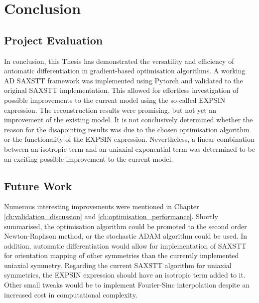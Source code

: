 \chapter{Conclusion}

\section{Project Evaluation}

In conclusion, this Thesis has demonstrated the versatility and efficiency of automatic differentiation in gradient-based optimisation algorithms.
A working AD SAXSTT framework was implemented using Pytorch and validated to the original SAXSTT implementation.
This allowed for effortless investigation of possible improvements to the current model using the so-called EXPSIN expression.
The reconstruction results were promising, but not yet an improvement of the existing model.
It is not conclusively determined whether the reason for the disapointing results was due to the chosen optimisation algorithm or the functionality of the EXPSIN expression.
Nevertheless, a linear combination between an isotropic term and an uniaxial exponential term was determined to be an exciting possible improvement to the current model.




\section{Future Work}

Numerous interesting improvements were mentioned in Chapter \ref{ch:validation_discussion} and \ref{ch:optimisation_performance}.
Shortly summarised, the optimisation algorithm could be promoted to the second order Newton-Raphson method, or the stochastic ADAM algorithm could be used.
In addition, automatic differentiation would allow for implementation of SAXSTT for orientation mapping of other symmetries than the currently implemented uniaxial symmetry.
Regarding the current SAXSTT algorithm for uniaxial symmetries, the EXPSIN expression should have an isotropic term added to it.
Other small tweaks would be to implement Fourier-Sinc interpolation despite an increased cost in computational complexity.

